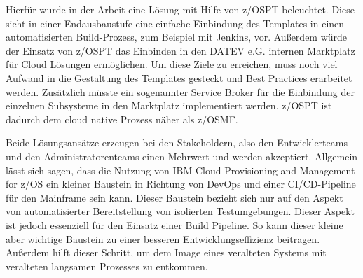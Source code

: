Hierfür wurde in der Arbeit eine Lösung mit Hilfe von z/OSPT beleuchtet.
Diese sieht in einer Endausbaustufe eine einfache Einbindung des Templates in einen automatisierten Build-Prozess, zum Beispiel mit Jenkins, vor.
Außerdem würde der Einsatz von z/OSPT das Einbinden in den DATEV e.G. internen \glqq Marktplatz\grqq{} für Cloud Lösungen ermöglichen.
Um diese Ziele zu erreichen, muss noch viel Aufwand in die Gestaltung des Templates gesteckt und Best Practices erarbeitet werden.
Zusätzlich müsste ein sogenannter \glqq Service Broker\grqq{} für die Einbindung der einzelnen Subsysteme in den \glqq Marktplatz\grqq{} implementiert werden.
z/OSPT ist dadurch dem cloud native Prozess näher als z/OSMF.

Beide Lösungsansätze erzeugen bei den Stakeholdern, also den Entwicklerteams und den Administratorenteams einen Mehrwert und werden akzeptiert.
Allgemein lässt sich sagen, dass die Nutzung von \glqq IBM Cloud Provisioning and Management for z/OS\grqq{} ein kleiner Baustein in Richtung von DevOps und einer CI/CD-Pipeline für den Mainframe sein kann.
Dieser Baustein bezieht sich nur auf den Aspekt von automatisierter Bereitstellung von isolierten Testumgebungen.
Dieser Aspekt ist jedoch essenziell für den Einsatz einer Build Pipeline.
So kann dieser kleine aber wichtige Baustein zu einer besseren Entwicklungseffizienz beitragen.
Außerdem hilft dieser Schritt, um dem Image eines veralteten Systems mit veralteten langsamen Prozesses zu entkommen.

